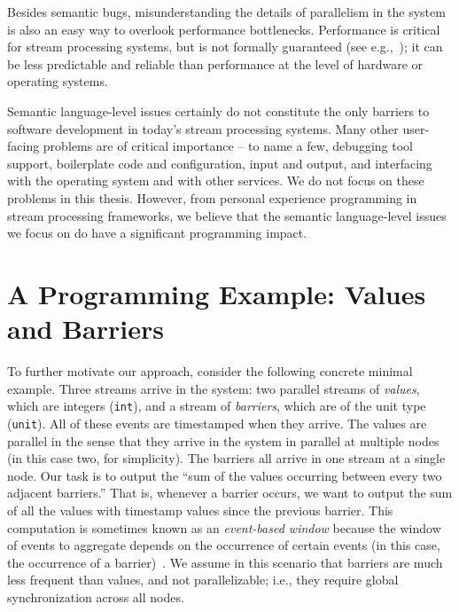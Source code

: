 Besides semantic bugs, misunderstanding the details of parallelism in the system is also an easy way to overlook performance bottlenecks. Performance is critical for stream processing systems, but is not formally guaranteed (see e.g.,~\cite{lopez2016performance,dias2018dsp-survey,hoffmann2018snailtrail,bordin2020dspbench}); it can be less predictable and reliable than performance at the level of hardware or operating systems.

Semantic language-level issues certainly do not constitute the only barriers to software development in today's stream processing systems. Many other user-facing problems are of critical importance -- to name a few, debugging tool support, boilerplate code and configuration, input and output, and interfacing with the operating system and with other services. We do not focus on these problems in this thesis. However, from personal experience programming in stream processing frameworks, we believe that the semantic language-level issues we focus on do have a significant programming impact.

\section{A Programming Example: Values and Barriers}
\label{ex:value-barrier}

To further motivate our approach, consider the following concrete minimal example.
Three streams arrive in the system: two parallel streams of \emph{values}, which are integers (\texttt{int}), and a stream of \emph{barriers}, which are of the unit type (\texttt{unit}).
All of these events are timestamped when they arrive.
The values are parallel in the sense that they arrive in the system in parallel at multiple nodes (in this case two, for simplicity).
The barriers all arrive in one stream at a single node.
Our task is to output the ``sum of the values occurring between every two adjacent barriers.'' That is, whenever a barrier occurs, we want to output the sum of all the values with timestamp values since the previous barrier. This computation is sometimes known as an \emph{event-based window} because the window of events to aggregate depends on the occurrence of certain events (in this case, the occurrence of a barrier)~\cite{EventBasedWindow}.
We assume in this scenario that barriers are much less frequent than values, and not parallelizable; i.e., they require global synchronization across all nodes.

